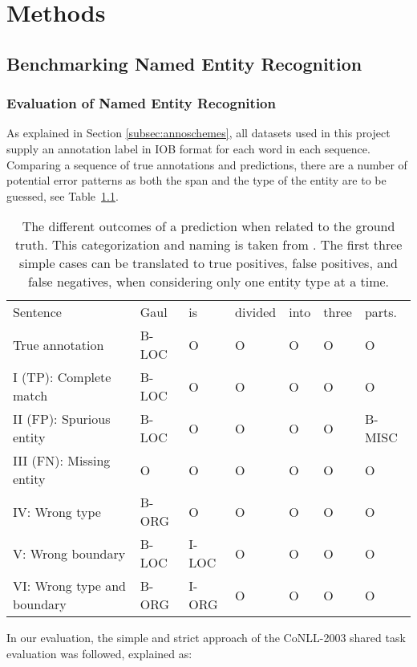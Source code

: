 \documentclass[main.tex]{subfiles}
\begin{document}
\chapter{Methods}
\label{chap:methods}

\section{Benchmarking Named Entity Recognition}
\subsection{Evaluation of Named Entity Recognition}
\label{subsec:nereval}
As explained in Section \ref{subsec:annoschemes}, all datasets used in this project supply an annotation label in IOB format \cite{ramshaw1995IOB} for each word in each sequence.
Comparing a sequence of true annotations and predictions, there are a number of potential error patterns as both the span and the type of the entity are to be guessed, see Table~\ref{tab:eval}.
\begin{table}[H]
    \footnotesize
    \centering
    \begin{tabular}{l|llllll}
        Sentence                    & Gaul & is & divided & into & three & parts.\\
        True annotation             & B-LOC & O & O & O & O & O \\\hline
        I (TP): Complete match      & B-LOC & O & O & O & O & O \\
        II (FP): Spurious entity    & B-LOC & O & O & O & O & B-MISC \\
        III (FN): Missing entity    & O     & O & O & O & O & O \\
        IV: Wrong type              & B-ORG & O & O & O & O & O \\
        V: Wrong boundary           & B-LOC & I-LOC & O & O & O & O \\
        VI: Wrong type and boundary & B-ORG & I-ORG & O & O & O & O
    \end{tabular}
    \caption{
        The different outcomes of a prediction when related to the ground truth.
        This categorization and naming is taken from \cite{batista2018eval}.
        The first three simple cases can be translated to true positives, false positives, and false negatives, when considering only one entity type at a time.
    }
    \label{tab:eval}
\end{table}\noindent
In our evaluation, the simple and strict approach of the CoNLL-2003 shared task evaluation was followed, explained as:
\end{document}
